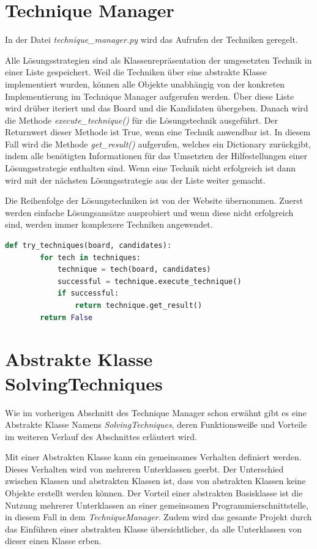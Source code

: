 \section{Technique Manager}

In der Datei \textit{technique\_manager.py} wird das Aufrufen der Techniken geregelt. 

Alle Lösungsstrategien sind als Klassenrepräsentation der umgesetzten Technik in einer Liste gespeichert. Weil die Techniken über eine abstrakte Klasse implementiert wurden, können alle Objekte unabhängig von der konkreten Implementierung im Technique Manager aufgerufen werden. Über diese Liste wird drüber iteriert und das Board und die Kandidaten übergeben. Danach wird die Methode \textit{execute\_technique()} für die Lösungstechnik ausgeführt. Der Returnwert dieser Methode ist True, wenn eine Technik anwendbar ist. In diesem Fall wird die Methode \textit{get\_result()} aufgerufen, welches ein Dictionary zurückgibt, indem alle benötigten Informationen für das Umsetzten der Hilfestellungen einer Lösungsstrategie enthalten sind.
Wenn eine Technik nicht erfolgreich ist dann wird mit der nächsten Lösungsstrategie aus der Liste weiter gemacht. 

Die Reihenfolge der Lösungstechniken ist von der Website \cite{martin} übernommen. Zuerst werden einfache Lösungsansätze ausprobiert und wenn diese nicht erfolgreich sind, werden immer komplexere Techniken angewendet. 

\begin{lstlisting}[language=Python, caption={Funktion um eine anwendbare Lösungstechnik zu finden}, label={lst:try}]
	def try_techniques(board, candidates):
		for tech in techniques:
			technique = tech(board, candidates)
			successful = technique.execute_technique()
			if successful:
				return technique.get_result()
		return False
\end{lstlisting}

\section{Abstrakte Klasse SolvingTechniques}

Wie im vorherigen Abschnitt des Technique Manager schon erwähnt gibt es eine Abstrakte Klasse Namens \textit{SolvingTechniques}, deren Funktionsweiße und Vorteile im weiteren Verlauf des Abschnittes erläutert wird. 

Mit einer Abstrakten Klasse kann ein gemeinsames Verhalten definiert werden. Dieses Verhalten wird von mehreren Unterklassen geerbt. Der Unterschied zwischen Klassen und abstrakten Klassen ist, dass von abstrakten Klassen keine Objekte erstellt werden können. Der Vorteil einer abstrakten Basisklasse ist die Nutzung mehrerer Unterklassen an einer gemeinsamen Programmierschnittstelle, in diesem Fall in dem \textit{TechniqueManager}. Zudem wird das gesamte Projekt durch das Einführen einer abstrakten Klasse übersichtlicher, da alle Unterklassen von dieser einen Klasse erben.

